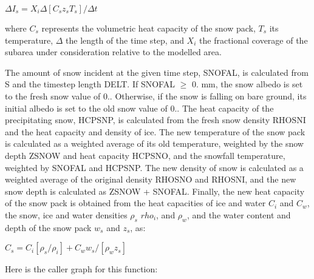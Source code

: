 $\Delta I_s = X_i \Delta [C_s z_s T_s] / \Delta t$

where $C_s$ represents the volumetric heat capacity of the snow pack, $T_s$ its temperature, $\Delta$ the length of the time step, and $X_i$ the fractional coverage of the subarea under consideration relative to the modelled area.

The amount of snow incident at the given time step, S\+N\+O\+F\+A\+L, is calculated from S and the timestep length D\+E\+L\+T. If S\+N\+O\+F\+A\+L $\geq$ 0. mm, the snow albedo is set to the fresh snow value of 0.. Otherwise, if the snow is falling on bare ground, its initial albedo is set to the old snow value of 0.. The heat capacity of the precipitating snow, H\+C\+P\+S\+N\+P, is calculated from the fresh snow density R\+H\+O\+S\+N\+I and the heat capacity and density of ice. The new temperature of the snow pack is calculated as a weighted average of its old temperature, weighted by the snow depth Z\+S\+N\+O\+W and heat capacity H\+C\+P\+S\+N\+O, and the snowfall temperature, weighted by S\+N\+O\+F\+A\+L and H\+C\+P\+S\+N\+P. The new density of snow is calculated as a weighted average of the original density R\+H\+O\+S\+N\+O and R\+H\+O\+S\+N\+I, and the new snow depth is calculated as Z\+S\+N\+O\+W + S\+N\+O\+F\+A\+L. Finally, the new heat capacity of the snow pack is obtained from the heat capacities of ice and water $C_i$ and $C_w$, the snow, ice and water densities $\rho_s$ $rho_i$, and $\rho_w$, and the water content and depth of the snow pack $w_s$ and $z_s$, as\+:

$C_s = C_i [ \rho_s /\rho_i ] + C_w w_s /[\rho_w z_s]$

Here is the caller graph for this function\+:


